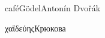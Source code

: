 \documentclass[UTF8]{article}
\begin{document}
café\quad Gödel\quad Antonín Dvořák

χαϊδεύης\qquad Крюкова
\end{document}
